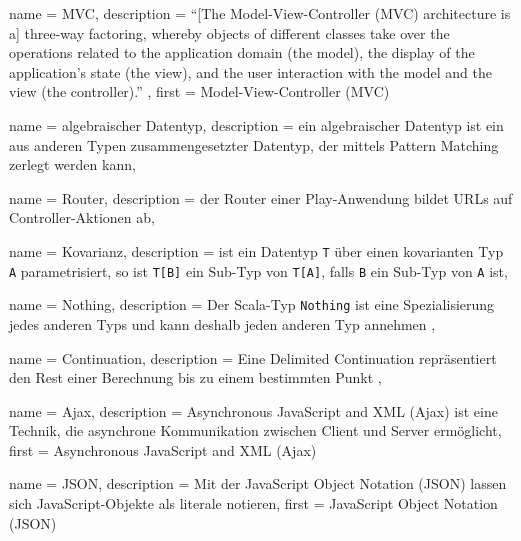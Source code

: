 






{
  name        = MVC,
  description = {"`[The Model-View-Controller (MVC) architecture is a] three-way factoring, whereby objects of different classes take over the operations related to the application domain (the model), the display of the application's state (the view), and the user interaction with the model and the view (the controller)."' \cite[vgl.][S.~1]{mvc}},
  first       = {Model-View-Controller (MVC)}
}


{
  name        = algebraischer Datentyp,
  description = {ein algebraischer Datentyp ist ein aus anderen Typen zusammengesetzter Datentyp, der mittels Pattern Matching zerlegt werden kann},
}


{
  name        = Router,
  description = {der Router einer Play-Anwendung bildet URLs auf Controller-Aktionen ab},
}


{
  name        = Kovarianz,
  description = {ist ein Datentyp \lstinline|T| über einen kovarianten Typ \lstinline|A| parametrisiert, so ist \lstinline|T[B]| ein Sub-Typ von \lstinline|T[A]|, falls \lstinline|B| ein Sub-Typ von \lstinline|A| ist},
}


{
  name        = Nothing,
  description = {Der Scala-Typ \lstinline|Nothing| ist eine Spezialisierung jedes anderen Typs und kann deshalb jeden anderen Typ annehmen \cite[vgl.][S.~256--257]{programming_in_scala}},
}


{
  name        = Continuation,
  description = {Eine Delimited Continuation repräsentiert den Rest einer Berechnung bis zu einem bestimmten Punkt \cite[vgl.][S.~1]{continuations}},
}


{
  name        = Ajax,
  description = {Asynchronous JavaScript and XML (Ajax) ist eine Technik, die asynchrone Kommunikation zwischen Client und Server ermöglicht},
  first       = {Asynchronous JavaScript and XML (Ajax)}
}


{
  name        = JSON,
  description = {Mit der JavaScript Object Notation (JSON) lassen sich JavaScript-Objekte als literale notieren},
  first       = {JavaScript Object Notation (JSON)}
}